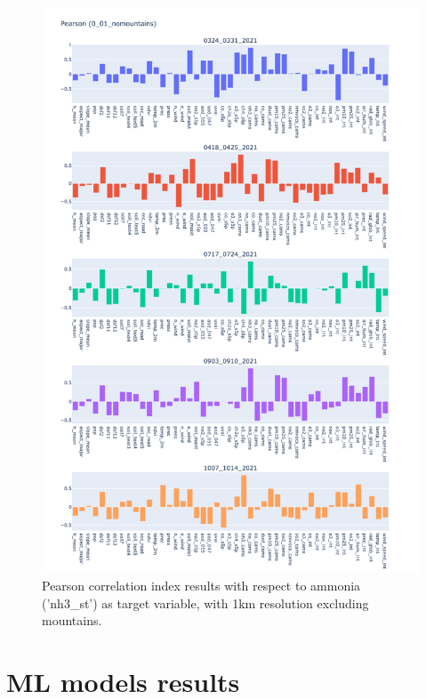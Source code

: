 \begin{figure}[H]
    \centering
    \includegraphics[scale=0.35]{images/tests/0_01_nomountainsnh3_st_pearson.png}
    \caption{Pearson correlation index results with respect to ammonia ('nh3\_st') as target variable, with 1km resolution excluding mountains.}
    
\end{figure}

\section{ML models results}
